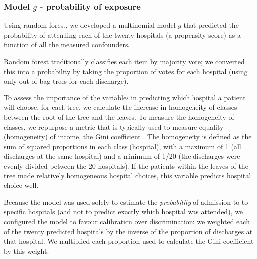 \documentclass[]{article}\usepackage[]{graphicx}\usepackage[]{color}
\begin{document}
\subsubsection{Model $g$ - probability of exposure}
Using random forest, we developed a multinomial model $g$ that predicted the probability of attending each of the twenty hospitals (a propensity score) as a function of all the measured confounders. 

Random forest traditionally classifies each item by majority vote; we converted this into a probability by taking the proportion of votes for each hospital (using only out-of-bag trees for each discharge).


To assess the importance of the variables in predicting which hospital a patient will choose, for each tree, we calculate the increase in homogeneity of classes between the root of the tree and the leaves. To measure the homogeneity of classes, we repurpose a metric that is typically used to measure equality (homogeneity) of income, the Gini coefficient \supercite{gini_variabilita_1912}. The homogeneity is defined as the sum of squared proportions in each class (hospital), with a maximum of 1 (all discharges at the same hospital) and a minimum of 1/20 (the discharges were evenly divided between the 20 hospitals). If the patients within the leaves of the tree made relatively homogeneous hospital choices, this variable predicts hospital choice well.

 
Because the model was used solely to estimate the \emph{probability} of admission to to specific hospitals (and not to predict exactly which hospital was attended), we configured the model to favour calibration over discrimination: we weighted each of the twenty predicted hospitals by the inverse of the proportion of discharges at that hospital. We multiplied each proportion used to calculate the Gini coefficient by this weight.
\end{document}
